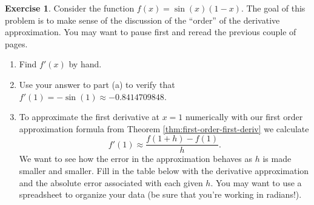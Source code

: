 \documentclass[
]{book}
\theoremstyle{definition}
\theoremstyle{definition}
\theoremstyle{definition}
\newtheorem{exercise}{Exercise}[chapter]
\theoremstyle{remark}
\begin{document}
\begin{exercise}
\protect\hypertarget{exr:deriv-error-analysis-ex}{}{\label{exr:deriv-error-analysis-ex} }Consider the function
\(f(x) = \sin(x) (1- x)\). The goal of this problem is to make sense of
the discussion of the ``order'' of the derivative approximation. You may
want to pause first and reread the previous couple of pages.

\begin{enumerate}
\def\labelenumi{\alph{enumi}.}
\item
  Find \(f'(x)\) by hand.
\item
  Use your answer to part (a) to verify that \(f'(1) = -\sin(1) \approx  -0.8414709848\).
\item
  To approximate the first derivative at \(x=1\) numerically with our first order approximation formula from Theorem \ref{thm:first-order-first-deriv} we calculate
  \[ f'(1) \approx \frac{f(1+h) - f(1)}{h}.\]
  We want to see how the error in the approximation behaves as \(h\) is made smaller and smaller. Fill in the table below with the derivative approximation and the absolute error associated with each given \(h\). You may want to use a spreadsheet to organize your data (be sure that you're working in radians!).


\end{enumerate}
\end{exercise}
\end{document}
